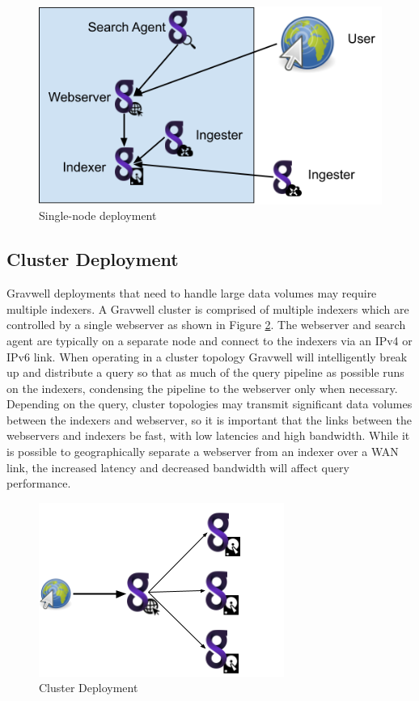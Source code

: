 {\begin{figure}[H]
	\includegraphics[width=0.6\linewidth]{images/singlenode.png}
	\caption{Single-node deployment}
	\label{fig:singlenode}
\end{figure}


\subsection{Cluster Deployment}

Gravwell deployments that need to handle large data volumes may require
multiple indexers. A Gravwell cluster is comprised of multiple indexers
which are controlled by a single webserver as shown in Figure \ref{fig:cluster}. The webserver and
search agent are typically on a separate node and connect to the indexers
via an IPv4 or IPv6 link. When operating in a cluster topology Gravwell
will intelligently break up and distribute a query so that as much of
the query pipeline as possible runs on the indexers, condensing
the pipeline to the webserver only when necessary. Depending on the
query, cluster topologies may transmit significant data volumes between
the indexers and webserver, so it is important that the links between
the webservers and indexers be fast, with low latencies and high
bandwidth. While it is possible to geographically separate a webserver
from an indexer over a WAN link, the increased latency and decreased
bandwidth will affect query performance.

\begin{figure}[H]
	\includegraphics[width=0.6\linewidth]{images/cluster.png}
	\caption{Cluster Deployment}
	\label{fig:cluster}
\end{figure}

}
